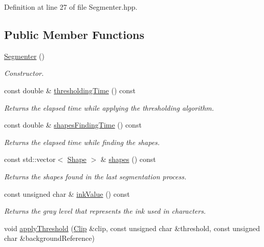Definition at line 27 of file Segmenter.hpp.\subsection*{Public Member Functions}
\begin{CompactItemize}
\item 
\hyperlink{class_segmenter_d39ec3bda31be180820aa0bdca7b125d}{Segmenter} ()
\begin{CompactList}\small\item\em Constructor. \item\end{CompactList}\item 
const double \& \hyperlink{class_segmenter_52f771c61d667df4f552ee73dc9f22e7}{thresholdingTime} () const 
\begin{CompactList}\small\item\em Returns the elapsed time while applying the thresholding algorithm. \item\end{CompactList}\item 
const double \& \hyperlink{class_segmenter_53761a65661587c45e34988b90401888}{shapesFindingTime} () const 
\begin{CompactList}\small\item\em Returns the elapsed time while finding the shapes. \item\end{CompactList}\item 
const std::vector$<$ \hyperlink{class_shape}{Shape} $>$ \& \hyperlink{class_segmenter_f2dd7f34c8b0f902323005335e41bd57}{shapes} () const 
\begin{CompactList}\small\item\em Returns the shapes found in the last segmentation process. \item\end{CompactList}\item 
const unsigned char \& \hyperlink{class_segmenter_e9bc56ddcbe5ea4abb40fcc85e3d9fbe}{inkValue} () const 
\begin{CompactList}\small\item\em Returns the gray level that represents the ink used in characters. \item\end{CompactList}\item 
void \hyperlink{class_segmenter_6854315e3320f9d9a8ece14cbb8570ee}{applyThreshold} (\hyperlink{class_clip}{Clip} \&clip, const unsigned char \&threshold, const unsigned char \&backgroundReference)

\end{CompactItemize}
